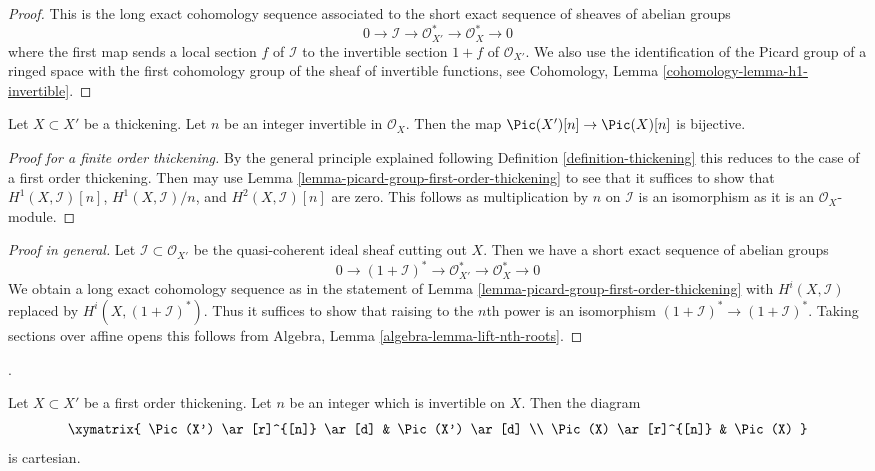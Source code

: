 \begin{proof}
This is the long exact cohomology sequence associated to the
short exact sequence of sheaves of abelian groups
$$
0 \to \mathcal{I} \to \mathcal{O}_{X'}^* \to \mathcal{O}_X^* \to 0
$$
where the first map sends a local section $f$ of $\mathcal{I}$
to the invertible section $1 + f$ of $\mathcal{O}_{X'}$.
We also use the identification of the Picard group of a
ringed space with the first cohomology group of the sheaf
of invertible functions, see
Cohomology, Lemma \ref{cohomology-lemma-h1-invertible}.
\end{proof}

\begin{lemma}
\label{lemma-torsion-pic-thickening}
Let $X \subset X'$ be a thickening. Let $n$ be an integer
invertible in $\mathcal{O}_X$. Then the map
$\Pic(X')[n] \to \Pic(X)[n]$ is bijective.
\end{lemma}

\begin{proof}[Proof for a finite order thickening]
By the general principle explained following
Definition \ref{definition-thickening}
this reduces to the case of a first order thickening.
Then may use Lemma \ref{lemma-picard-group-first-order-thickening}
to see that it suffices to show that
$H^1(X, \mathcal{I})[n]$, $H^1(X, \mathcal{I})/n$, and
$H^2(X, \mathcal{I})[n]$ are zero.
This follows as multiplication by $n$ on $\mathcal{I}$
is an isomorphism as it is an $\mathcal{O}_X$-module.
\end{proof}

\begin{proof}[Proof in general]
Let $\mathcal{I} \subset \mathcal{O}_{X'}$ be the quasi-coherent ideal
sheaf cutting out $X$. Then we have a short exact sequence of
abelian groups
$$
0 \to (1 + \mathcal{I})^* \to \mathcal{O}_{X'}^* \to \mathcal{O}_X^* \to 0
$$
We obtain a long exact cohomology sequence as in the statement of
Lemma \ref{lemma-picard-group-first-order-thickening}
with $H^i(X, \mathcal{I})$ replaced by $H^i(X, (1 + \mathcal{I})^*)$.
Thus it suffices to show that raising to the $n$th power is an
isomorphism $(1 + \mathcal{I})^* \to (1 + \mathcal{I})^*$.
Taking sections over affine opens this follows from
Algebra, Lemma \ref{algebra-lemma-lift-nth-roots}.
\end{proof}

\begin{lemma}
\label{lemma-pic-roots-first-order-thickening}
\begin{reference}
\cite[Expos\'e 236, Lemma 2.6, p. 233]{FGA}.
\end{reference}
Let $X \subset X'$ be a first order thickening. Let $n$ be an integer
which is invertible on $X$. Then the diagram
$$
\xymatrix{
\Pic(X') \ar[r]^{[n]} \ar[d] & \Pic(X') \ar[d] \\
\Pic(X) \ar[r]^{[n]} & \Pic(X)
}
$$
is cartesian.
\end{lemma}

